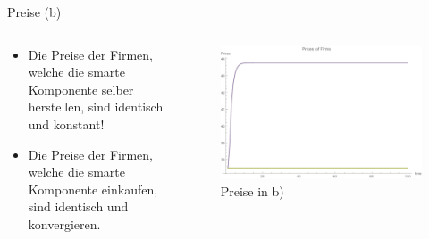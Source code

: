 \documentclass[xcolor={dvipsnames},10pt]{beamer}
\begin{document}
\begin{frame}{Preise (b)}
\begin{columns}[T]
    \begin{column}{.3\textwidth}
      \begin{itemize}
      \item Die Preise der Firmen, welche die smarte Komponente selber herstellen, sind identisch und konstant!
      \item Die Preise der Firmen, welche die smarte Komponente einkaufen, sind identisch und konvergieren.
      \end{itemize}
      \end{column}
      \begin{column}{.7\textwidth}
      \begin{figure}[t]
            \centering
            \includegraphics[scale=0.35]{../Plots/prices1b}
            \caption{Preise in b)}
            \label{fig:prices1b}
       \end{figure}
    \end{column}
  \end{columns}
\end{frame}
\end{document}
